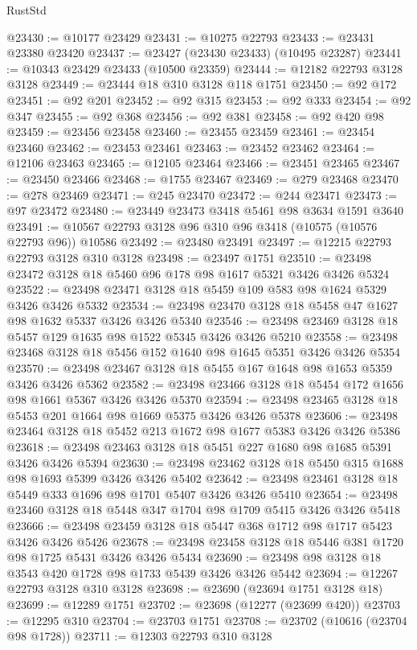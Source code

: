 \begin{lexlean}{RustStd}
\begin{coremodule}
@23430 := @10177 @23429
@23431 := @10275 @22793
@23433 := @23431 @23380 @23420
@23437 := @23427 (@23430 @23433) (@10495 @23287)
@23441 := @10343 @23429 @23433 (@10500 @23359)
@23444 := @12182 @22793 @3128 @3128
@23449 := @23444 @18 @310 @3128 @118 @1751
@23450 := @92 @172
@23451 := @92 @201
@23452 := @92 @315
@23453 := @92 @333
@23454 := @92 @347
@23455 := @92 @368
@23456 := @92 @381
@23458 := @92 @420 @98
@23459 := @23456 @23458
@23460 := @23455 @23459
@23461 := @23454 @23460
@23462 := @23453 @23461
@23463 := @23452 @23462
@23464 := @12106 @23463
@23465 := @12105 @23464
@23466 := @23451 @23465
@23467 := @23450 @23466
@23468 := @1755 @23467
@23469 := @279 @23468
@23470 := @278 @23469
@23471 := @245 @23470
@23472 := @244 @23471
@23473 := @97 @23472
@23480 := @23449 @23473 @3418 @5461 @98 @3634 @1591 @3640
@23491 := @10567 @22793 @3128 @96 @310 @96 @3418 (@10575 (@10576 @22793 @96)) @10586
@23492 := @23480 @23491
@23497 := @12215 @22793 @22793 @3128 @310 @3128
@23498 := @23497 @1751
@23510 := @23498 @23472 @3128 @18 @5460 @96 @178 @98 @1617 @5321 @3426 @3426 @5324
@23522 := @23498 @23471 @3128 @18 @5459 @109 @583 @98 @1624 @5329 @3426 @3426 @5332
@23534 := @23498 @23470 @3128 @18 @5458 @47 @1627 @98 @1632 @5337 @3426 @3426 @5340
@23546 := @23498 @23469 @3128 @18 @5457 @129 @1635 @98 @1522 @5345 @3426 @3426 @5210
@23558 := @23498 @23468 @3128 @18 @5456 @152 @1640 @98 @1645 @5351 @3426 @3426 @5354
@23570 := @23498 @23467 @3128 @18 @5455 @167 @1648 @98 @1653 @5359 @3426 @3426 @5362
@23582 := @23498 @23466 @3128 @18 @5454 @172 @1656 @98 @1661 @5367 @3426 @3426 @5370
@23594 := @23498 @23465 @3128 @18 @5453 @201 @1664 @98 @1669 @5375 @3426 @3426 @5378
@23606 := @23498 @23464 @3128 @18 @5452 @213 @1672 @98 @1677 @5383 @3426 @3426 @5386
@23618 := @23498 @23463 @3128 @18 @5451 @227 @1680 @98 @1685 @5391 @3426 @3426 @5394
@23630 := @23498 @23462 @3128 @18 @5450 @315 @1688 @98 @1693 @5399 @3426 @3426 @5402
@23642 := @23498 @23461 @3128 @18 @5449 @333 @1696 @98 @1701 @5407 @3426 @3426 @5410
@23654 := @23498 @23460 @3128 @18 @5448 @347 @1704 @98 @1709 @5415 @3426 @3426 @5418
@23666 := @23498 @23459 @3128 @18 @5447 @368 @1712 @98 @1717 @5423 @3426 @3426 @5426
@23678 := @23498 @23458 @3128 @18 @5446 @381 @1720 @98 @1725 @5431 @3426 @3426 @5434
@23690 := @23498 @98 @3128 @18 @3543 @420 @1728 @98 @1733 @5439 @3426 @3426 @5442
@23694 := @12267 @22793 @3128 @310 @3128
@23698 := @23690 (@23694 @1751 @3128 @18)
@23699 := @12289 @1751
@23702 := @23698 (@12277 (@23699 @420))
@23703 := @12295 @310
@23704 := @23703 @1751
@23708 := @23702 (@10616 (@23704 @98 @1728))
@23711 := @12303 @22793 @310 @3128

\end{coremodule}
\end{lexlean}
